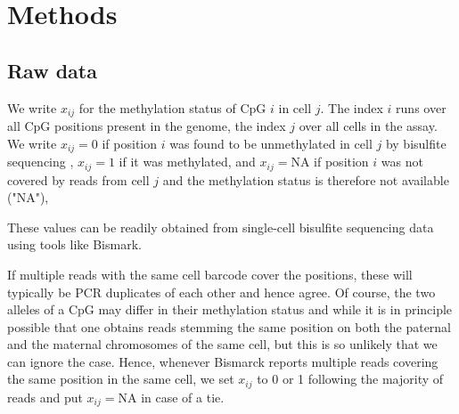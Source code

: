 \documentclass[twocolumn,10pt]{article}
\begin{document}



\section{Methods}

\subsection{Raw data}

We write $x_{ij}$ for the methylation status of CpG $i$ in cell $j$. The index $i$ runs over all CpG positions present in the genome, the index $j$ over all cells in the assay. We write $x_{ij}=0$ if position $i$ was found to be unmethylated in cell $j$ by bisulfite sequencing , $x_{ij}=1$ if it was methylated, and $x_{ij}=\text{NA}$ if position $i$ was not covered by reads from cell $j$ and the methylation status is therefore not available ("NA"),

These values can be readily obtained from single-cell bisulfite sequencing data using tools like Bismark.

If multiple reads with the same cell barcode cover the positions, these will typically be PCR duplicates of each other and hence agree. Of course, the two alleles of a CpG may differ in their methylation status and while it is in principle possible that one obtains reads stemming the same position on both the paternal and the maternal chromosomes of the same cell, but this is so unlikely that we can ignore the case. Hence, whenever Bismarck reports multiple reads covering the same position in the same cell, we set $x_{ij}$ to 0 or 1 following the majority of reads and put $x_{ij}=\text{NA}$ in case of a tie. 
\end{document}
